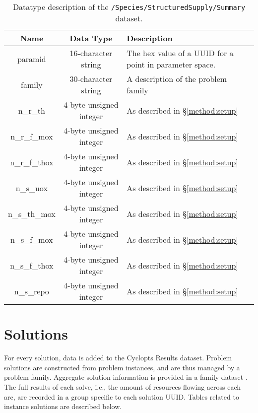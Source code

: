 \begin{table}[h!]
\centering
\label{tbl:/Species/StructuredSupply/Summary}
\caption{Datatype description of the \lstinline[basicstyle=\ttfamily\color{black}]|/Species/StructuredSupply/Summary| dataset.}
\begin{tabularx}{\columnwidth-10pt}{|c|c|X|} %
\hline
\textbf{Name} & \textbf{Data Type} & \textbf{Description}       \\ \hline
paramid & 16-character string & The hex value of a UUID for a point in parameter space. \\ \hline
family & 30-character string & A description of the problem family \\ \hline
n\_r\_th & 4-byte unsigned integer & As described in \S \ref{method:setup} \\ \hline
n\_r\_f\_mox & 4-byte unsigned integer & As described in \S \ref{method:setup} \\ \hline
n\_r\_f\_thox & 4-byte unsigned integer & As described in \S \ref{method:setup} \\ \hline
n\_s\_uox & 4-byte unsigned integer & As described in \S \ref{method:setup} \\ \hline
n\_s\_th\_mox & 4-byte unsigned integer & As described in \S \ref{method:setup} \\ \hline
n\_s\_f\_mox & 4-byte unsigned integer & As described in \S \ref{method:setup} \\ \hline
n\_s\_f\_thox & 4-byte unsigned integer & As described in \S \ref{method:setup} \\ \hline
n\_s\_repo & 4-byte unsigned integer & As described in \S \ref{method:setup} \\ \hline
\end{tabularx}
\end{table}

\section{Solutions}

For every solution, data is added to the Cyclopts Results dataset. Problem
solutions are constructed from problem instances, and are thus managed by a
problem family. Aggregate solution information is provided in a family dataset
. The full results of
each solve, i.e., the amount of resources flowing across each arc, are recorded
in a group specific to each solution UUID. Tables related to instance solutions
are described below.

